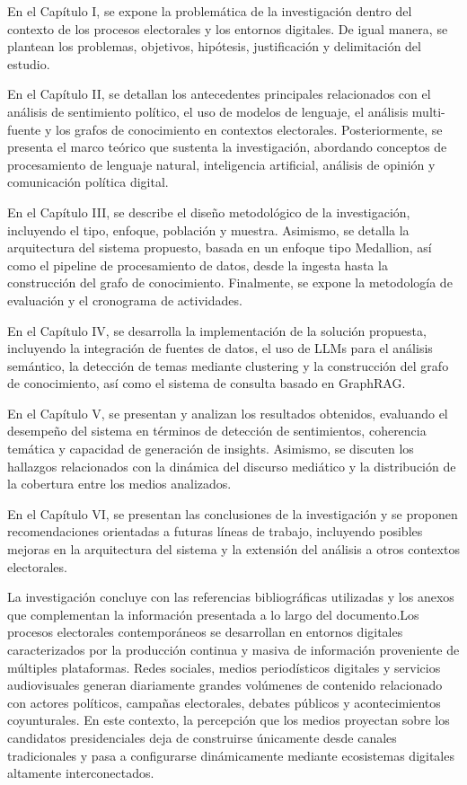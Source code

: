 En el Capítulo I, se expone la problemática de la investigación dentro del contexto de los procesos electorales y los entornos digitales. De igual manera, se plantean los problemas, objetivos, hipótesis, justificación y delimitación del estudio.

En el Capítulo II, se detallan los antecedentes principales relacionados con el análisis de sentimiento político, el uso de modelos de lenguaje, el análisis multi-fuente y los grafos de conocimiento en contextos electorales. Posteriormente, se presenta el marco teórico que sustenta la investigación, abordando conceptos de procesamiento de lenguaje natural, inteligencia artificial, análisis de opinión y comunicación política digital.

En el Capítulo III, se describe el diseño metodológico de la investigación, incluyendo el tipo, enfoque, población y muestra. Asimismo, se detalla la arquitectura del sistema propuesto, basada en un enfoque tipo Medallion, así como el pipeline de procesamiento de datos, desde la ingesta hasta la construcción del grafo de conocimiento. Finalmente, se expone la metodología de evaluación y el cronograma de actividades.

En el Capítulo IV, se desarrolla la implementación de la solución propuesta, incluyendo la integración de fuentes de datos, el uso de LLMs para el análisis semántico, la detección de temas mediante clustering y la construcción del grafo de conocimiento, así como el sistema de consulta basado en GraphRAG.

En el Capítulo V, se presentan y analizan los resultados obtenidos, evaluando el desempeño del sistema en términos de detección de sentimientos, coherencia temática y capacidad de generación de insights. Asimismo, se discuten los hallazgos relacionados con la dinámica del discurso mediático y la distribución de la cobertura entre los medios analizados.

En el Capítulo VI, se presentan las conclusiones de la investigación y se proponen recomendaciones orientadas a futuras líneas de trabajo, incluyendo posibles mejoras en la arquitectura del sistema y la extensión del análisis a otros contextos electorales.

La investigación concluye con las referencias bibliográficas utilizadas y los anexos que complementan la información presentada a lo largo del documento.Los procesos electorales contemporáneos se desarrollan en entornos digitales caracterizados por la producción continua y masiva de información proveniente de múltiples plataformas. Redes sociales, medios periodísticos digitales y servicios audiovisuales generan diariamente grandes volúmenes de contenido relacionado con actores políticos, campañas electorales, debates públicos y acontecimientos coyunturales. En este contexto, la percepción que los medios proyectan sobre los candidatos presidenciales deja de construirse únicamente desde canales tradicionales y pasa a configurarse dinámicamente mediante ecosistemas digitales altamente interconectados.

